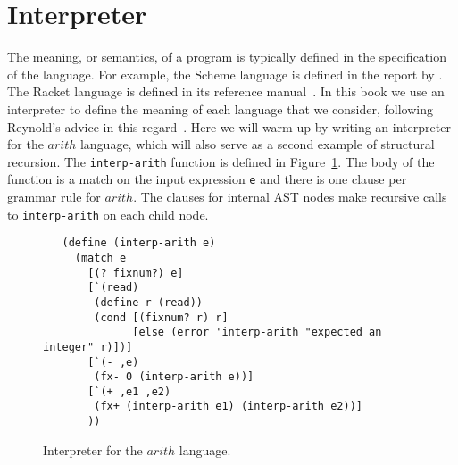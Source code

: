 \documentclass[12pt]{book}
\newcommand{\itm}[1]{\ensuremath{\mathit{#1}}}
\newcommand{\Exp}{\itm{exp}}
\newcommand{\Int}{\itm{int}}
\newcommand{\Var}{\itm{var}}
\newcommand{\Op}{\itm{op}}
\newcommand{\key}[1]{\texttt{#1}}
\newcommand{\LET}[3]{(\key{let}\,([#1\;#2])\,#3)}
\begin{document}


\section{Interpreter}
\label{sec:interp-arith}

The meaning, or semantics, of a program is typically defined in the
specification of the language. For example, the Scheme language is
defined in the report by \cite{SPERBER:2009aa}. The Racket language is
defined in its reference manual~\citep{plt-tr}. In this book we use an
interpreter to define the meaning of each language that we consider,
following Reynold's advice in this
regard~\citep{reynolds72:_def_interp}. Here we will warm up by writing
an interpreter for the $\itm{arith}$ language, which will also serve
as a second example of structural recursion. The \texttt{interp-arith}
function is defined in Figure~\ref{fig:interp-arith}. The body of the
function is a match on the input expression \texttt{e} and there is
one clause per grammar rule for $\itm{arith}$. The clauses for
internal AST nodes make recursive calls to \texttt{interp-arith} on
each child node.

\begin{figure}[tbp]
\begin{lstlisting}
   (define (interp-arith e)
     (match e
       [(? fixnum?) e]
       [`(read)
        (define r (read))
        (cond [(fixnum? r) r]
              [else (error 'interp-arith "expected an integer" r)])]
       [`(- ,e)
        (fx- 0 (interp-arith e))]
       [`(+ ,e1 ,e2)
        (fx+ (interp-arith e1) (interp-arith e2))]
       ))
\end{lstlisting}
\caption{Interpreter for the $\itm{arith}$ language.}
\label{fig:interp-arith}
\end{figure}
\end{document}
